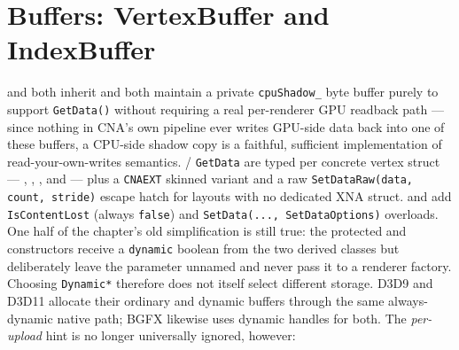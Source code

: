 \section{Buffers: VertexBuffer and IndexBuffer}

 and  both inherit 
and both maintain a private \texttt{cpuShadow\_} byte buffer purely to support
\texttt{GetData()} without requiring a real per-renderer GPU readback path --- since nothing
in CNA's own pipeline ever writes GPU-side data back into one of these buffers, a CPU-side
shadow copy is a faithful, sufficient implementation of read-your-own-writes semantics.
 / \texttt{GetData} are typed per concrete vertex struct ---
,
,
, and
 --- plus a
\texttt{CNAEXT} skinned variant and a raw \texttt{SetDataRaw(data, count, stride)} escape hatch
for layouts with no dedicated XNA struct.  and
 add \texttt{IsContentLost} (always \texttt{false}) and
\texttt{SetData(..., SetDataOptions)} overloads. One half of the chapter's old simplification
is still true: the protected  and  constructors
receive a \texttt{dynamic} boolean from the two derived classes but deliberately leave the
parameter unnamed and never pass it to a renderer factory. Choosing \texttt{Dynamic*} therefore
does not itself select different storage. D3D9 and D3D11 allocate their ordinary and dynamic
buffers through the same always-dynamic native path; BGFX likewise uses dynamic handles for
both. The \emph{per-upload} hint is no longer universally ignored, however:

